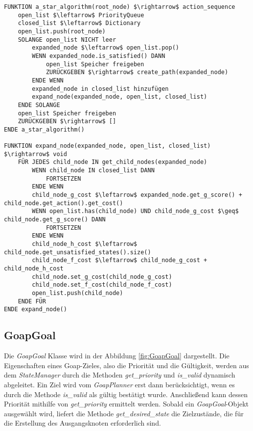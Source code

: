 \begin{lstlisting}[language=Pseudo, caption={a\_star\_algorithm Methode}, mathescape=true, label={lst:pseudo astar}]
FUNKTION a_star_algorithm(root_node) $\rightarrow$ action_sequence
	open_list $\leftarrow$ PriorityQueue
	closed_list $\leftarrow$ Dictionary
	open_list.push(root_node)
	SOLANGE open_list NICHT leer
		expanded_node $\leftarrow$ open_list.pop()
		WENN expanded_node.is_satisfied() DANN
			open_list Speicher freigeben
			ZURÜCKGEBEN $\rightarrow$ create_path(expanded_node)
		ENDE WENN
		expanded_node in closed_list hinzufügen
		expand_node(expanded_node, open_list, closed_list)
	ENDE SOLANGE
	open_list Speicher freigeben
	ZURÜCKGEBEN $\rightarrow$ []
ENDE a_star_algorithm()

FUNKTION expand_node(expanded_node, open_list, closed_list) $\rightarrow$ void
	FÜR JEDES child_node IN get_child_nodes(expanded_node)
		WENN child_node IN closed_list DANN
			FORTSETZEN
		ENDE WENN
		child_node_g_cost $\leftarrow$ expanded_node.get_g_score() + child_node.get_action().get_cost()
		WENN open_list.has(child_node) UND child_node_g_cost $\geq$ child_node.get_g_score() DANN
			FORTSETZEN
		ENDE WENN
		child_node_h_cost $\leftarrow$ child_node.get_unsatisfied_states().size()
		child_node_f_cost $\leftarrow$ child_node_g_cost + child_node_h_cost
		child_node.set_g_cost(child_node_g_cost)
		child_node.set_f_cost(child_node_f_cost)
		open_list.push(child_node)
	ENDE FÜR
ENDE expand_node()
\end{lstlisting}





\subsection{GoapGoal}
\label{chap:goapgoal uml}

Die \textit{GoapGoal} Klasse wird in der Abbildung \ref{fig:GoapGoal} dargestellt. Die Eigenschaften eines Goap-Zieles, also die Priorität und die Gültigkeit, werden aus dem \textit{StateManager} durch die Methoden \textit{get\_priority} und \textit{is\_valid} dynamisch abgeleitet. Ein Ziel wird vom \textit{GoapPlanner} erst dann berücksichtigt, wenn es durch die Methode \textit{is\_valid} als gültig bestätigt wurde. Anschlie\ss{}end kann dessen Priorität mithilfe von \textit{get\_priority} ermittelt werden. Sobald ein \textit{GoapGoal}-Objekt ausgewählt wird, liefert die Methode \textit{get\_desired\_state} die Zielzustände, die für die Erstellung des Ausgangsknoten erforderlich sind.

